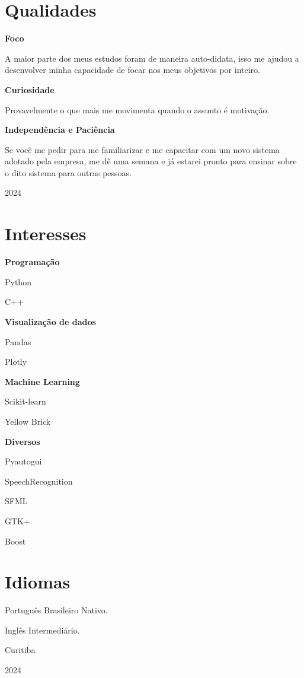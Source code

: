 \documentclass{article}
\newcommand{\cvsection}[1]{\section*{\rmfamily#1}}
\begin{document}
\vspace*{.15cm}
\cvsection{Qualidades}
\noindent

{\large

\textbf{Foco}

\hspace{2em}A maior parte dos meus estudos foram de maneira auto-didata,
isso me ajudou a desenvolver minha capacidade de focar nos meus objetivos
por inteiro.

\textbf{Curiosidade}

\hspace{2em}Provavelmente o que mais me movimenta quando o assunto é
motivação.

\textbf{Independência e Paciência}

\hspace{2em}Se você me pedir para me familiarizar e me capacitar com um novo sistema adotado pela empresa,
me dê uma semana e já estarei pronto para ensinar sobre o dito sistema para outras pessoas.

}

\vfill
\begin{center}
    \Large 2024
\end{center}

\newpage
\indent

\cvsection{Interesses}
\indent

{\large

\textbf{Programação}

\hspace{2em}Python

\hspace{2em}C++

\textbf{Visualização de dados}

\hspace{2em}Pandas

\hspace{2em}Plotly

\textbf{Machine Learning}

\hspace{2em}Scikit-learn

\hspace{2em}Yellow Brick

\textbf{Diversos}

\hspace{2em}Pyautogui

\hspace{2em}SpeechRecognition

\hspace{2em}SFML

\hspace{2em}GTK+

\hspace{2em}Boost



}

\indent
\cvsection{Idiomas}
\indent

{\large

Português Brasileiro Nativo.

Inglês Intermediário.

}

\vfill
\begin{center}
    {\Large 
    Curitiba

    2024
    }
\end{center}
\end{document}
